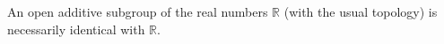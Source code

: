 An open additive subgroup of the real numbers $\mathbb{R}$ (with the usual topology) is necessarily identical with $\mathbb{R}$.
